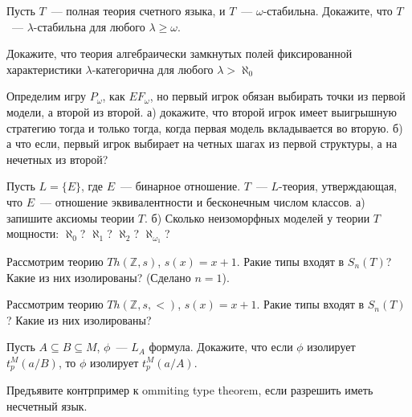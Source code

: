\setcounter{curtask}{19}


\begin{task}
    Пусть $T$~--- полная теория счетного языка, и $T$~---
    $\omega$-стабильна. Докажите, что $T$~--- $\lambda$-стабильна для любого $\lambda
    \ge \omega$.
\end{task}


\breakline


\begin{ptask}{6}
    Докажите, что теория алгебраически замкнутых полей фиксированной характеристики
    $\lambda$-категорична для любого $\lambda > \aleph_0$
\end{ptask}

\begin{ptask}{9}
    Определим игру $P_{\omega}$, как $EF_{\omega}$, но первый игрок обязан выбирать
    точки из первой модели, а второй из второй.
	а) докажите, что второй игрок имеет выигрышную стратегию тогда и только тогда,
    когда первая модель вкладывается во вторую.
    б) а что если, первый игрок выбирает на четных шагах из первой структуры, а на
    нечетных из второй?
\end{ptask}

\begin{ptask}{10}
    Пусть $L = \{E\}$, где $E$~--- бинарное отношение. $T$~--- $L$-теория,
    утверждающая, что $E$~--- отношение эквивалентности и бесконечным числом классов.
    а) запишите аксиомы теории $T$.
    б) Сколько неизоморфных моделей у теории $T$ мощности: $\aleph_0$? $\aleph_1$?
    $\aleph_2$? $\aleph_{\omega_1}$?
\end{ptask}

\begin{ptask}{15}
    Рассмотрим теорию $Th(\mathbb{Z}, s)$, $s(x) = x + 1$. Ракие типы входят в
    $S_n(T)$? Какие из них изолированы? (Сделано $n = 1$).
\end{ptask}

\begin{ptask}{16}
    Рассмотрим теорию $Th(\mathbb{Z}, s, <)$, $s(x) = x + 1$. Ракие типы входят в
    $S_n(T)$? Какие из них изолированы?
\end{ptask}

\begin{ptask}{17}
    Пусть $A \subseteq B \subseteq M$, $\phi$~--- $L_A$ формула. Докажите, что если
    $\phi$ изолирует $t_p^M(a / B)$, то $\phi$ изолирует $t_p^M(a / A)$.
\end{ptask}

\begin{ptask}{18}
    Предъявите контрпример к ommiting type theorem, если разрешить иметь несчетный
    язык.
\end{ptask}
